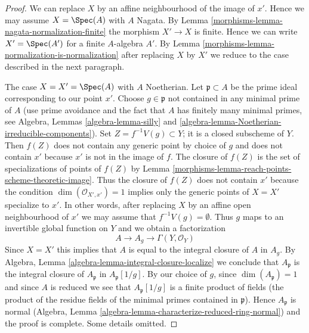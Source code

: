 \begin{proof}

We can replace $X$ by an affine neighbourhood of the image of $x'$.
Hence we may assume $X = \Spec(A)$ with $A$ Nagata.
By Lemma \ref{morphisms-lemma-nagata-normalization-finite}
the morphism $X' \to X$ is finite. Hence we can write
$X' = \Spec(A')$ for a finite $A$-algebra $A'$.
By Lemma \ref{morphisms-lemma-normalization-is-normalization}
after replacing $X$ by $X'$
we reduce to the case described in the next paragraph.

\medskip\noindent
The case $X = X' = \Spec(A)$ with $A$ Noetherian.
Let $\mathfrak p \subset A$ be the prime ideal
corresponding to our point $x'$. Choose $g \in \mathfrak p$
not contained in any minimal prime of $A$ (use prime avoidance
and the fact that $A$ has finitely many minimal primes, see
Algebra, Lemmas \ref{algebra-lemma-silly} and
\ref{algebra-lemma-Noetherian-irreducible-components}).
Set $Z = f^{-1}V(g) \subset Y$; it is a closed subscheme of $Y$.
Then $f(Z)$ does not contain any generic point by choice of $g$
and does not contain $x'$ because $x'$ is not in the image of $f$.
The closure of $f(Z)$ is the set of specializations of points
of $f(Z)$ by Lemma \ref{morphisms-lemma-reach-points-scheme-theoretic-image}.
Thus the closure of $f(Z)$ does not contain $x'$ because
the condition $\dim(\mathcal{O}_{X', x'}) = 1$ implies only
the generic points of $X = X'$ specialize to $x'$.
In other words, after replacing $X$ by an affine open
neighbourhood of $x'$ we may assume that $f^{-1}V(g) = \emptyset$.
Thus $g$ maps to an invertible global function on $Y$ and
we obtain a factorization
$$
A \to A_g \to \Gamma(Y, \mathcal{O}_Y)
$$
Since $X = X'$ this implies that $A$ is equal to the integral
closure of $A$ in $A_g$. By
Algebra, Lemma \ref{algebra-lemma-integral-closure-localize}
we conclude that $A_\mathfrak p$ is the integral closure
of $A_\mathfrak p$ in $A_\mathfrak p[1/g]$.
By our choice of $g$, since $\dim(A_\mathfrak p) = 1$
and since $A$ is reduced we see that $A_\mathfrak p[1/g]$
is a finite product of fields (the product of the residue fields
of the minimal primes contained in $\mathfrak p$). Hence $A_\mathfrak p$ is
normal (Algebra, Lemma \ref{algebra-lemma-characterize-reduced-ring-normal})
and the proof is complete. Some details omitted.
\end{proof}

